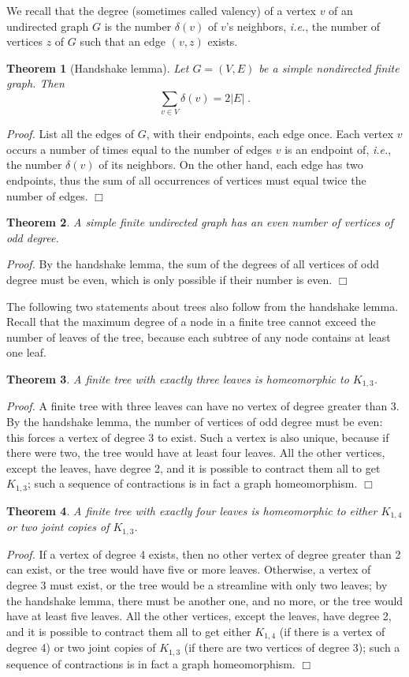 \documentclass[12pt]{article}
\newcommand{\ie}{\textit{i.e.}}
\newtheorem{theorem}{Theorem}
\begin{document}
We recall that the degree (sometimes called valency)
of a vertex $v$ of an undirected graph $G$
is the number $\delta(v)$ of $v$'s neighbors,
\ie, the number of vertices $z$ of $G$
such that an edge $(v,z)$ exists.

\begin{theorem}[Handshake lemma]
Let $G=(V,E)$ be a simple nondirected finite graph. Then
\begin{equation} \label{eq:handshake}
\sum_{v\in V}\delta(v)=2|E|\;.
\end{equation}
\end{theorem}
\textit{Proof.}
List all the edges of $G$, with their endpoints, each edge once.
Each vertex $v$ occurs a number of times
equal to the number of edges $v$ is an endpoint of,
\ie, the number $\delta(v)$ of its neighbors.
On the other hand, each edge has two endpoints,
thus the sum of all occurrences of vertices
must equal twice the number of edges.
$\Box$
\begin{theorem}
A simple finite undirected graph
has an even number of vertices of odd degree.
\end{theorem}
\textit{Proof.}
By the handshake lemma,
the sum of the degrees of all vertices of odd degree must be even,
which is only possible if their number is even.
$\Box$

The following two statements about trees also follow from the handshake lemma.
Recall that the maximum degree of a node in a finite tree
cannot exceed the number of leaves of the tree,
because each subtree of any node contains at least one leaf.
\begin{theorem}
A finite tree with exactly three leaves
is homeomorphic to $K_{1,3}$.
\end{theorem}
\textit{Proof.}
A finite tree with three leaves can have no vertex of degree greater than 3.
By the handshake lemma, the number of vertices of odd degree must be even:
this forces a vertex of degree 3 to exist.
Such a vertex is also unique,
because if there were two, the tree would have at least four leaves.
All the other vertices, except the leaves, have degree 2,
and it is possible to contract them all to get $K_{1,3}$;
such a sequence of contractions is in fact a graph homeomorphism.
$\Box$
\begin{theorem}
A finite tree with exactly four leaves
is homeomorphic to either $K_{1,4}$ or two joint copies of $K_{1,3}$.
\end{theorem}
\textit{Proof.}
If a vertex of degree 4 exists,
then no other vertex of degree greater than 2 can exist,
or the tree would have five or more leaves.
Otherwise, a vertex of degree 3 must exist,
or the tree would be a streamline with only two leaves;
by the handshake lemma, there must be another one,
and no more, or the tree would have at least five leaves.
All the other vertices, except the leaves, have degree 2,
and it is possible to contract them all
to get either $K_{1,4}$ (if there is a vertex of degree 4)
or two joint copies of $K_{1,3}$ (if there are two vertices of degree 3);
such a sequence of contractions is in fact a graph homeomorphism.
$\Box$
\end{document}
